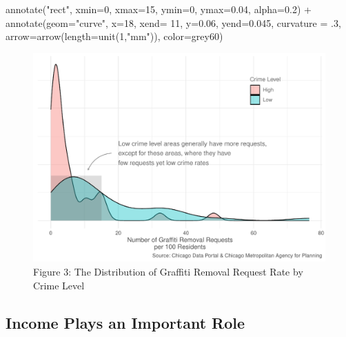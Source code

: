 \documentclass[
]{report}
\newenvironment{Shaded}{}{}
\newcommand{\AttributeTok}[1]{\textcolor[rgb]{0.65,0.15,0.64}{#1}}
\newcommand{\DecValTok}[1]{\textcolor[rgb]{0.60,0.41,0.00}{#1}}
\newcommand{\FloatTok}[1]{\textcolor[rgb]{0.60,0.41,0.00}{#1}}
\newcommand{\FunctionTok}[1]{\textcolor[rgb]{0.25,0.47,0.95}{#1}}
\newcommand{\NormalTok}[1]{\textcolor[rgb]{0.22,0.23,0.26}{#1}}
\newcommand{\SpecialCharTok}[1]{\textcolor[rgb]{0.00,0.52,0.74}{#1}}
\newcommand{\StringTok}[1]{\textcolor[rgb]{0.31,0.63,0.31}{#1}}
\begin{document}
\begin{Shaded}
\begin{Highlighting}[]
  \FunctionTok{annotate}\NormalTok{(}\StringTok{"rect"}\NormalTok{, }\AttributeTok{xmin=}\DecValTok{0}\NormalTok{, }\AttributeTok{xmax=}\DecValTok{15}\NormalTok{, }\AttributeTok{ymin=}\DecValTok{0}\NormalTok{, }\AttributeTok{ymax=}\FloatTok{0.04}\NormalTok{, }\AttributeTok{alpha=}\FloatTok{0.2}\NormalTok{) }\SpecialCharTok{+}
  \FunctionTok{annotate}\NormalTok{(}\AttributeTok{geom=}\StringTok{"curve"}\NormalTok{, }\AttributeTok{x=}\DecValTok{18}\NormalTok{, }\AttributeTok{xend=} \DecValTok{11}\NormalTok{, }\AttributeTok{y=}\FloatTok{0.06}\NormalTok{, }\AttributeTok{yend=}\FloatTok{0.045}\NormalTok{,}
           \AttributeTok{curvature =}\NormalTok{ .}\DecValTok{3}\NormalTok{, }\AttributeTok{arrow=}\FunctionTok{arrow}\NormalTok{(}\AttributeTok{length=}\FunctionTok{unit}\NormalTok{(}\DecValTok{1}\NormalTok{,}\StringTok{"mm"}\NormalTok{)), }\AttributeTok{color=}\StringTok{\textquotesingle{}grey60\textquotesingle{}}\NormalTok{)}
\end{Highlighting}
\end{Shaded}

\begin{figure}[H]

\caption{Figure 3: The Distribution of Graffiti Removal Request Rate by
Crime Level}

{\centering \includegraphics{final_solo_files/figure-pdf/unnamed-chunk-4-1.pdf}

}

\end{figure}

\hypertarget{income-plays-an-important-role}{%
\subsection{Income Plays an Important
Role}\label{income-plays-an-important-role}}
\end{document}
